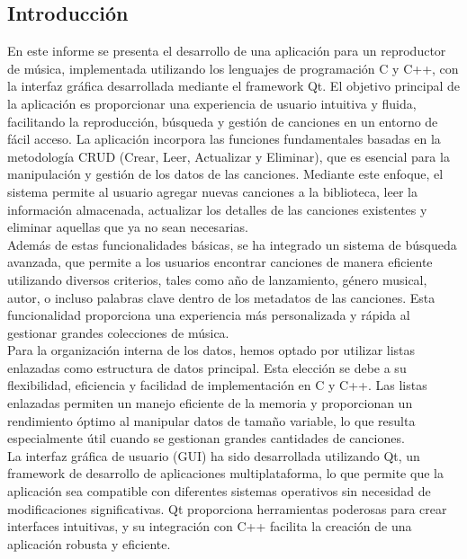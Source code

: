 \documentclass[12pt]{article}
\begin{document}
    \tableofcontents
    
    \newpage
    \setlength{\parindent}{4em}
    \begin{flushleft}
        \section{Introducción}
        \noindent\hspace*{4em}En este informe se presenta el desarrollo de una aplicación para un reproductor de música, implementada utilizando los lenguajes de programación C y C++, con la interfaz gráfica desarrollada mediante el framework Qt. El objetivo principal de la aplicación es proporcionar una experiencia de usuario intuitiva y fluida, facilitando la reproducción, búsqueda y gestión de canciones en un entorno de fácil acceso. La aplicación incorpora las funciones fundamentales basadas en la metodología CRUD (Crear, Leer, Actualizar y Eliminar), que es esencial para la manipulación y gestión de los datos de las canciones. Mediante este enfoque, el sistema permite al usuario agregar nuevas canciones a la biblioteca, leer la información almacenada, actualizar los detalles de las canciones existentes y eliminar aquellas que ya no sean necesarias.\\
    
        \noindent\hspace*{4em}Además de estas funcionalidades básicas, se ha integrado un sistema de búsqueda avanzada, que permite a los usuarios encontrar canciones de manera eficiente utilizando diversos criterios, tales como año de lanzamiento, género musical, autor, o incluso palabras clave dentro de los metadatos de las canciones. Esta funcionalidad proporciona una experiencia más personalizada y rápida al gestionar grandes colecciones de música.\\
    
        \noindent\hspace*{4em}Para la organización interna de los datos, hemos optado por utilizar listas enlazadas como estructura de datos principal. Esta elección se debe a su flexibilidad, eficiencia y facilidad de implementación en C y C++. Las listas enlazadas permiten un manejo eficiente de la memoria y proporcionan un rendimiento óptimo al manipular datos de tamaño variable, lo que resulta especialmente útil cuando se gestionan grandes cantidades de canciones.\\
    
        \noindent\hspace*{4em}La interfaz gráfica de usuario (GUI) ha sido desarrollada utilizando Qt, un framework de desarrollo de aplicaciones multiplataforma, lo que permite que la aplicación sea compatible con diferentes sistemas operativos sin necesidad de modificaciones significativas. Qt proporciona herramientas poderosas para crear interfaces intuitivas, y su integración con C++ facilita la creación de una aplicación robusta y eficiente.\\
    

\end{flushleft}
\end{document}
